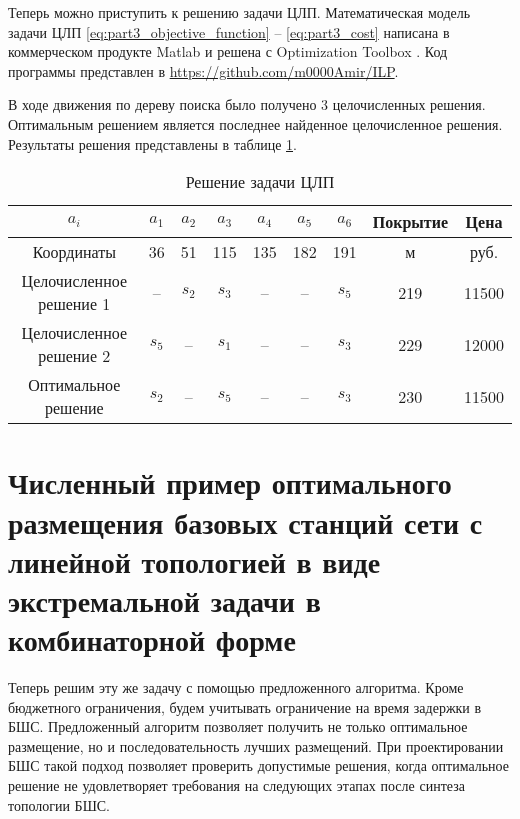 Теперь можно приступить к решению задачи ЦЛП. Математическая модель задачи ЦЛП \cref{eq:part3_objective_function} -- \cref{eq:part3_cost} написана в коммерческом продукте Matlab и решена с Optimization Toolbox \cite{optimization_toolbox}. Код программы представлен в \url{https://github.com/m0000Amir/ILP}.
 
В ходе движения по дереву поиска было получено 3 целочисленных решения. Оптимальным решением является последнее найденное целочисленное решения. Результаты решения представлены в таблице \cref{tab:part4_ilp_solution}.



\begin{table}[h!]\tiny\centering
  \begin{tabular}{|c||c|c|c|c|c|c||c|c|}\hline
    $a_i$ & $a_1$ &  $a_2$ & $a_3$ & $a_4$ & $a_5$ & $a_6$   & Покрытие & Цена \\ \hline 
    Координаты & 36 & 51 & 115 & 135 & 182 & 191 & м & руб.\\ \hline \hline
    Целочисленное решение 1 & --  & $s_2$ & $s_3$ & -- & -- & $s_5$ & 219 & 11500\\ 
    Целочисленное решение 2 & $s_5$ & -- & $s_1$ & -- & -- & $s_3$ & 229 & 12000\\
    Оптимальное решение & $s_2$ & -- & $s_5$ & -- & -- & $s_3$ & 230 & 11500 \\ \hline
\end{tabular}\caption{Решение задачи ЦЛП}\label{tab:part4_ilp_solution}
\end{table}



\section{Численный пример оптимального размещения базовых станций сети с линейной топологией в виде экстремальной задачи в комбинаторной форме}\label{part4:bnb_solution}

Теперь решим эту же задачу с помощью предложенного алгоритма. Кроме бюджетного ограничения, будем учитывать ограничение на время задержки в БШС. Предложенный алгоритм позволяет получить не только оптимальное размещение, но и последовательность лучших размещений. При проектировании БШС такой подход позволяет проверить допустимые решения, когда оптимальное решение не удовлетворяет требования на следующих этапах после синтеза топологии БШС.

